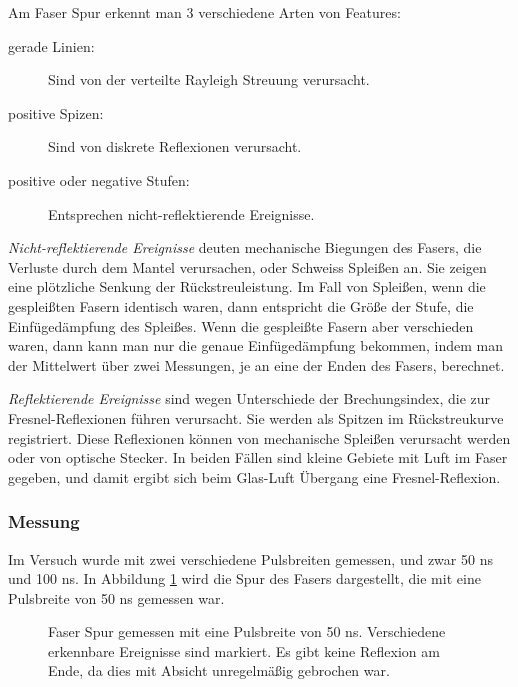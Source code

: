 \documentclass[a4paper]{article}
\begin{document}
Am Faser Spur erkennt man 3 verschiedene Arten von Features:
\begin{description}
  \item[gerade Linien:] Sind von der verteilte Rayleigh Streuung verursacht.
  \item[positive Spizen:] Sind von diskrete Reflexionen verursacht.
  \item[positive oder negative Stufen:] Entsprechen nicht-reflektierende
    Ereignisse. 
\end{description}

\emph{Nicht-reflektierende Ereignisse} deuten mechanische Biegungen des Fasers,
die Verluste durch dem Mantel verursachen, oder Schweiss Spleißen an. Sie
zeigen eine plötzliche Senkung der Rückstreuleistung. Im Fall von Spleißen,
wenn die gespleißten Fasern identisch waren, dann entspricht die Größe der
Stufe, die Einfügedämpfung des Spleißes. Wenn die gespleißte Fasern aber
verschieden waren, dann kann man nur die genaue Einfügedämpfung bekommen, indem
man der Mittelwert über zwei Messungen, je an eine der Enden des Fasers,
berechnet. 

\emph{Reflektierende Ereignisse} sind wegen Unterschiede der Brechungsindex,
die zur Fresnel-Reflexionen führen verursacht. Sie werden als Spitzen im
Rückstreukurve registriert. Diese Reflexionen können von mechanische Spleißen
verursacht werden oder von optische Stecker. In beiden Fällen sind kleine
Gebiete mit Luft im Faser gegeben, und damit ergibt sich beim Glas-Luft
Übergang eine Fresnel-Reflexion.

\subsubsection{Messung}
Im Versuch wurde mit zwei verschiedene Pulsbreiten gemessen, und zwar 50 ns und
100 ns. In Abbildung \ref{fig:pw50} wird die Spur des Fasers dargestellt, die
mit eine Pulsbreite von 50 ns gemessen war. 
\begin{figure}[H]
  \centering
  \caption{Faser Spur gemessen mit eine Pulsbreite von 50 ns. Verschiedene
  erkennbare Ereignisse sind markiert. Es gibt keine Reflexion am Ende, da 
  dies mit Absicht unregelmäßig gebrochen war.}
  \label{fig:pw50}
\end{figure}
\end{document}

